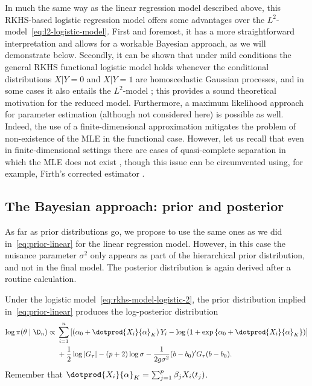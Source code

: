 In much the same way as the linear regression model described above, this RKHS-based logistic regression model offers some advantages over the \(L^2\)-model~\eqref{eq:l2-logistic-model}. First and foremost, it has a more straightforward interpretation and allows for a workable Bayesian approach, as we will demonstrate below. Secondly, it can be shown that under mild conditions the general RKHS functional logistic model holds whenever the conditional distributions \(X | Y=0\) and \(X|Y=1\) are homoscedastic Gaussian processes, and in some cases it also entails the \(L^2\)-model \citep[see Theorem 1 in][]{berrendero2023functional}; this provides a sound theoretical motivation for the reduced model. Furthermore, a maximum likelihood approach for parameter estimation (although not considered here) is possible as well. Indeed, the use of a finite-dimensional approximation  mitigates the problem of non-existence of the MLE in the functional case. However, let us recall that even in finite-dimensional settings there are cases of quasi-complete separation in which the MLE does not exist \citep{albert1984existence}, though this issue can be circumvented using, for example, Firth's corrected estimator \citep{firth1993bias}.

\subsection*{The Bayesian approach: prior and posterior}

As far as prior distributions go, we propose to use the same ones as we did in~\eqref{eq:prior-linear} for the linear regression model. However, in this case the nuisance parameter \(\sigma^2\) only appears as part of the hierarchical prior distribution, and not in the final model. The posterior distribution is again derived after a routine calculation.

\begin{proposition}
Under the logistic model~\eqref{eq:rkhs-model-logistic-2}, the prior distribution implied in~\eqref{eq:prior-linear} produces the log-posterior distribution
\begin{align*}
  \log \pi(\theta \mid \D_n) \propto {} & \sum_{i=1}^n \left[ \left(\alpha_0 + \dotprod{X_i}{\alpha}_K\right)Y_i - \log\left(1 + \exp\left\{\alpha_0 + \dotprod{X_i}{\alpha}_K\right\}\right)\right]\\
  \quad &+ \frac{1}{2}\log |G_\tau| - (p+2)\log \sigma -\frac{1}{2g\sigma^2} (b - b_0)'G_\tau(b - b_0).
\end{align*}
Remember that \(\dotprod{X_i}{\alpha}_K = \sum_{j=1}^p \beta_j X_i(t_j)\).
\end{proposition}

